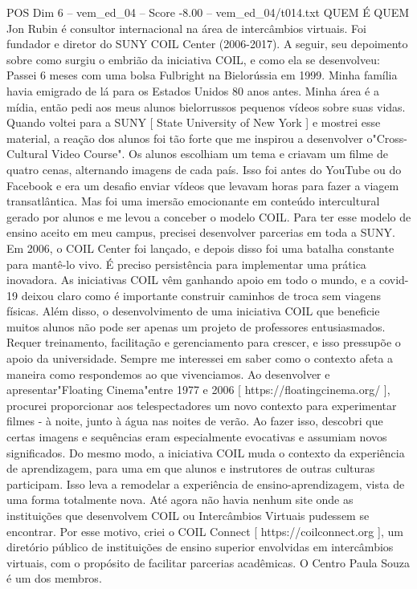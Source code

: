 \begin{textsample}{POS Dim 6 – vem\_ed\_04 – Score -8.00 – vem\_ed\_04/t014.txt}  \label{ex:f6_pos_140}
QUEM É QUEM Jon Rubin é consultor internacional na área de intercâmbios virtuais.
Foi fundador e diretor do SUNY COIL Center (2006-2017).
A seguir, seu depoimento sobre como surgiu o embrião da iniciativa COIL, e como ela se desenvolveu: Passei 6 meses com uma bolsa Fulbright na Bielorússia em 1999.
Minha família havia emigrado de lá para os Estados Unidos 80 anos antes.
Minha área é a mídia, então pedi aos meus alunos bielorrussos pequenos vídeos sobre suas vidas.
Quando voltei para a SUNY [ State University of New York ] e mostrei esse material, a reação dos alunos foi tão forte que me inspirou a desenvolver o"Cross-Cultural Video Course".
Os alunos escolhiam um tema e criavam um filme de quatro cenas, alternando imagens de cada país.
Isso foi antes do YouTube ou do Facebook e era um desafio enviar vídeos que levavam horas para fazer a viagem transatlântica.
Mas foi uma imersão emocionante em conteúdo intercultural gerado por alunos e me levou a conceber o modelo COIL.
Para ter esse modelo de ensino aceito em meu campus, precisei desenvolver parcerias em toda a SUNY.
Em 2006, o COIL Center foi lançado, e depois disso foi uma batalha constante para mantê-lo vivo.
É preciso persistência para implementar uma prática inovadora.
As iniciativas COIL vêm ganhando apoio em todo o mundo, e a covid-19 deixou claro como é importante construir caminhos de troca sem viagens físicas.
Além disso, o desenvolvimento de uma iniciativa COIL que beneficie muitos alunos não pode ser apenas um projeto de professores entusiasmados.
Requer treinamento, facilitação e gerenciamento para crescer, e isso pressupõe o apoio da universidade.
Sempre me interessei em saber como o contexto afeta a maneira como respondemos ao que vivenciamos.
Ao desenvolver e apresentar"Floating Cinema"entre 1977 e 2006 [ https://floatingcinema.org/ ], procurei proporcionar aos telespectadores um novo contexto para experimentar filmes - à noite, junto à água nas noites de verão.
Ao fazer isso, descobri que certas imagens e sequências eram especialmente evocativas e assumiam novos significados.
Do mesmo modo, a iniciativa COIL muda o contexto da experiência de aprendizagem, para uma em que alunos e instrutores de outras culturas participam.
Isso leva a remodelar a experiência de ensino-aprendizagem, vista de uma forma totalmente nova.
Até agora não havia nenhum site onde as instituições que desenvolvem COIL ou Intercâmbios Virtuais pudessem se encontrar.
Por esse motivo, criei o COIL Connect [ https://coilconnect.org ], um diretório público de instituições de ensino superior envolvidas em intercâmbios virtuais, com o propósito de facilitar parcerias acadêmicas.
O Centro Paula Souza é um dos membros.

\end{textsample}
